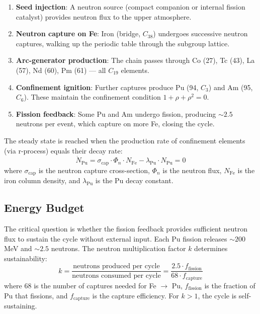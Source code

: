 \begin{enumerate}
  \item \textbf{Seed injection}: A neutron source (compact companion or internal
    fission catalyst) provides neutron flux to the upper atmosphere.
  \item \textbf{Neutron capture on Fe}: Iron (bridge, $C_{38}$) undergoes successive
    neutron captures, walking up the periodic table through the subgroup lattice.
  \item \textbf{Arc-generator production}: The chain passes through Co (27), Tc (43),
    La (57), Nd (60), Pm (61) --- all $C_{19}$ elements.
  \item \textbf{Confinement ignition}: Further captures produce Pu (94, $C_3$) and
    Am (95, $C_6$). These maintain the confinement condition $1 + \rho + \rho^2 = 0$.
  \item \textbf{Fission feedback}: Some Pu and Am undergo fission, producing
    $\sim 2.5$ neutrons per event, which capture on more Fe, closing the cycle.
\end{enumerate}

The steady state is reached when the production rate of confinement elements
(via r-process) equals their decay rate:
\begin{equation}
\dot{N}_\text{Pu} = \sigma_\text{cap} \cdot \Phi_n \cdot N_\text{Fe}
  - \lambda_\text{Pu} \cdot N_\text{Pu} = 0
\end{equation}
where $\sigma_\text{cap}$ is the neutron capture cross-section, $\Phi_n$ is the
neutron flux, $N_\text{Fe}$ is the iron column density, and $\lambda_\text{Pu}$
is the Pu decay constant.

\subsection{Energy Budget}

The critical question is whether the fission feedback provides sufficient
neutron flux to sustain the cycle without external input. Each Pu fission
releases $\sim 200$ MeV and $\sim 2.5$ neutrons. The neutron multiplication
factor $k$ determines sustainability:
\begin{equation}
k = \frac{\text{neutrons produced per cycle}}{\text{neutrons consumed per cycle}}
  = \frac{2.5 \cdot f_\text{fission}}{68 \cdot f_\text{capture}}
\end{equation}
where 68 is the number of captures needed for Fe $\to$ Pu, $f_\text{fission}$
is the fraction of Pu that fissions, and $f_\text{capture}$ is the capture
efficiency. For $k > 1$, the cycle is self-sustaining.


